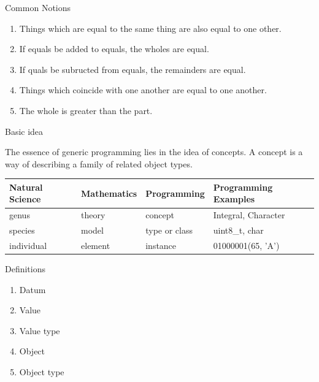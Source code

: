 \documentclass[10pt]{beamer}
\begin{document}
\begin{frame}{Common Notions}
\begin{enumerate}
	\item Things which are equal to the same thing are also equal to one other.
	\item If equals be added to equals, the wholes are equal.
	\item If quals be subructed from equals, the remainders are equal.
	\item Things which coincide with one another are equal to one another.
	\item The whole is greater than the part.
\end{enumerate}
\end{frame}



\begin{frame}{Basic idea}
\begin{block}{}
The essence of generic programming lies in the idea of concepts. A concept is a way of describing a family of related object types.
\end{block}
\begin{center}
    \begin{tabular}{ | p{1.5cm} | l | l | p{3cm} |}
    \hline
    \textbf{Natural Science} & \textbf{Mathematics} & \textbf{Programming} & \textbf{Programming Examples} \\ \hline
      genus & theory & concept & Integral, Character \\ \hline
      species & model & type or class & uint8\_t, char \\ \hline
      individual & element & instance  & 01000001(65, 'A') \\
    \hline
    \end{tabular}
\end{center}
\end{frame}


\begin{frame}[fragile]{Definitions}
  \begin{enumerate}
    \item Datum
    \item Value
    \item Value type
    \item Object
    \item Object type
  \end{enumerate}
\end{frame}
\end{document}
